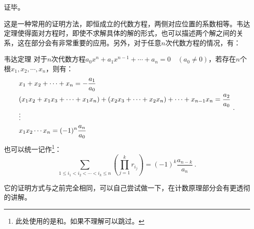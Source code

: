 证毕。

这是一种常用的证明方法，即恒成立的代数方程，两侧对应位置的系数相等。韦达定理使得面对方程时，即使不求解具体的解的形式，也可以描述两个解之间的关系，这在部分会有非常重要的应用。另外，对于任意$n$次代数方程的情况，有：
\begin{theorem}{韦达定理}
对于$n$次代数方程$a_0x^n+a_1x^{n-1}+\cdots+a_n=0\quad(a_0\neq0)$，若存在$n$个根$x_1,x_2,\cdots,x_n$，则有：
\begin{equation}
\begin{split}
&x_1+x_2+\cdots +x_n=-{a_1\over a_0}\\
&(x_1x_2+x_1x_3+\cdots+ x_1x_n)+(x_2x_3+\cdots +x_2x_n)+\cdots+x_{n-1}x_n={a_2\over a_0}\\
&\vdots\\
&x_1x_2\cdots x_n=(-1)^n{a_n\over a_0}
\end{split}~.
\end{equation}
也可以统一记作\footnote{此处使用的是和。如果不理解可以跳过。}：
\begin{equation}
\sum_{1\le i_1 < i_2 < \cdots < i_k\le n} \left(\prod_{j = 1}^k r_{i_j}\right)=(-1)^k\frac{a_{n-k}}{a_n}~.
\end{equation}
\end{theorem}

它的证明方式与之前完全相同，可以自己尝试做一下，在计数原理部分会有更透彻的讲解。